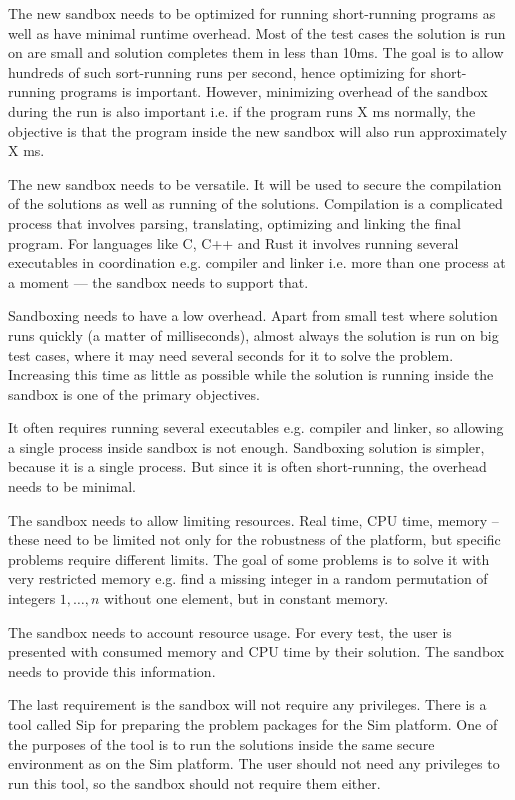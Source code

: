 \documentclass[en]{pracamgr}
\begin{document}
The new sandbox needs to be optimized for running short-running programs as well as have minimal runtime overhead. Most of the test cases the solution is run on are small and solution completes them in less than 10ms. The goal is to allow hundreds of such sort-running runs per second, hence optimizing for short-running programs is important. However, minimizing overhead of the sandbox during the run is also important i.e. if the program runs X ms normally, the objective is that the program inside the new sandbox will also run approximately X ms.

The new sandbox needs to be versatile. It will be used to secure the compilation of the solutions as well as running of the solutions. Compilation is a complicated process that involves parsing, translating, optimizing and linking the final program. For languages like C, C++ and Rust it involves running several executables in coordination e.g. compiler and linker i.e. more than one process at a moment --- the sandbox needs to support that.

Sandboxing needs to have a low overhead. Apart from small test where solution runs quickly (a matter of milliseconds), almost always the solution is run on big test cases, where it may need several seconds for it to solve the problem. Increasing this time as little as possible while the solution is running inside the sandbox is one of the primary objectives.

It often requires running several executables e.g. compiler and linker, so allowing a single process inside sandbox is not enough. Sandboxing solution is simpler, because it is a single process. But since it is often short-running, the overhead needs to be minimal.

The sandbox needs to allow limiting resources. Real time, CPU time, memory -- these need to be limited not only for the robustness of the platform, but specific problems require different limits. The goal of some problems is to solve it with very restricted memory e.g. find a missing integer in a random permutation of integers $1, \ldots, n$ without one element, but in constant memory.

The sandbox needs to account resource usage. For every test, the user is presented with consumed memory and CPU time by their solution. The sandbox needs to provide this information.

The last requirement is the sandbox will not require any privileges. There is a tool called Sip \cite{sip} for preparing the problem packages for the Sim platform. One of the purposes of the tool is to run the solutions inside the same secure environment as on the Sim platform. The user should not need any privileges to run this tool, so the sandbox should not require them either.
\end{document}
